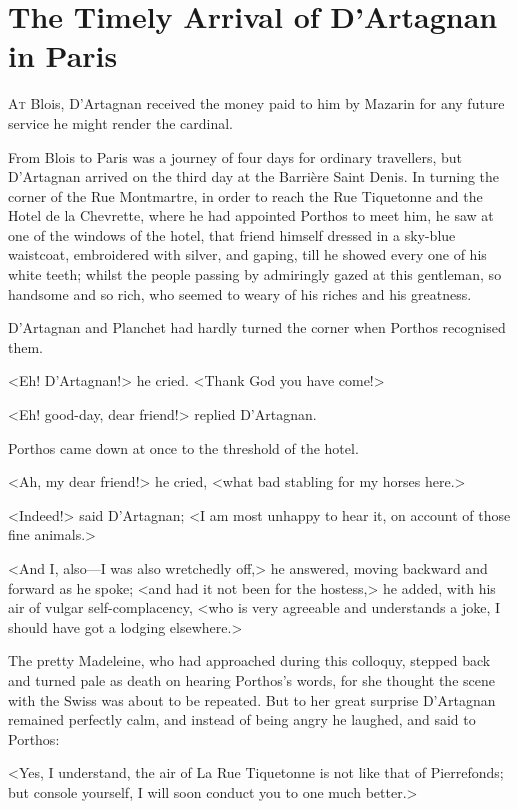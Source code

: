 \chapter{The Timely Arrival of D'Artagnan in Paris}

 \lettrine{A}{t} Blois, D'Artagnan received the money paid to him by Mazarin for any future service he might render the cardinal.

\zz
From Blois to Paris was a journey of four days for ordinary travellers, but D'Artagnan arrived on the third day at the Barrière Saint Denis. In turning the corner of the Rue Montmartre, in order to reach the Rue Tiquetonne and the Hotel de la Chevrette, where he had appointed Porthos to meet him, he saw at one of the windows of the hotel, that friend himself dressed in a sky-blue waistcoat, embroidered with silver, and gaping, till he showed every one of his white teeth; whilst the people passing by admiringly gazed at this gentleman, so handsome and so rich, who seemed to weary of his riches and his greatness.

D'Artagnan and Planchet had hardly turned the corner when Porthos recognised them.

<Eh! D'Artagnan!> he cried. <Thank God you have come!>

<Eh! good-day, dear friend!> replied D'Artagnan.

Porthos came down at once to the threshold of the hotel.

<Ah, my dear friend!> he cried, <what bad stabling for my horses here.>

<Indeed!> said D'Artagnan; <I am most unhappy to hear it, on account of those fine animals.>

<And I, also—I was also wretchedly off,> he answered, moving backward and forward as he spoke; <and had it not been for the hostess,> he added, with his air of vulgar self-complacency, <who is very agreeable and understands a joke, I should have got a lodging elsewhere.>

The pretty Madeleine, who had approached during this colloquy, stepped back and turned pale as death on hearing Porthos's words, for she thought the scene with the Swiss was about to be repeated. But to her great surprise D'Artagnan remained perfectly calm, and instead of being angry he laughed, and said to Porthos:

<Yes, I understand, the air of La Rue Tiquetonne is not like that of Pierrefonds; but console yourself, I will soon conduct you to one much better.>

